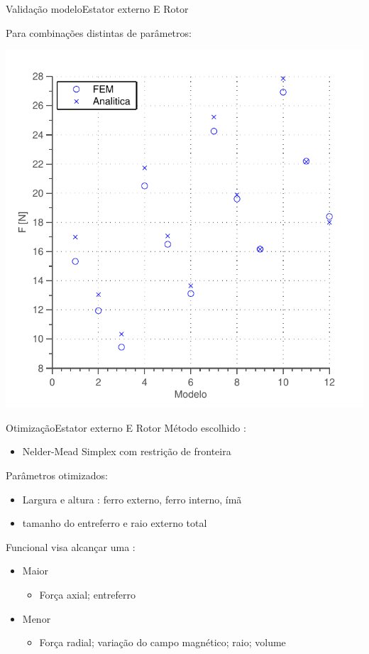\documentclass{beamer}
\begin{document}
\begin{frame}{Validação modelo}{Estator externo E Rotor}

Para combinações distintas de parâmetros:
	
\begin{center}
\includegraphics[width=0.7\linewidth]{../../Dissertacao/Figs/Simulacoes/Passivo2/validacao_passivo_parametros}
\end{center}
\end{frame}

%
%

\begin{frame}{Otimização}{Estator externo E Rotor}
Método escolhido :
\begin{itemize}
	\item Nelder-Mead Simplex com restrição de fronteira
\end{itemize}

Parâmetros otimizados:
\begin{itemize}
	\item Largura e altura : ferro externo, ferro interno, ímã
	\item tamanho do entreferro e raio externo total
\end{itemize}

Funcional visa alcançar uma :
\begin{itemize}
	\item Maior
		\begin{itemize}
		\item Força axial; entreferro
		\end{itemize}
	\item Menor
		\begin{itemize}
		\item Força radial; variação do campo magnético; raio; volume
		\end{itemize}
\end{itemize} 
\end{frame}
\end{document}
